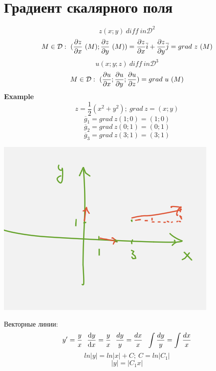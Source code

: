 \documentclass{article}
\begin{document}
\section{Градиент скалярного поля}
\begin{equation*}
    z(x;y)\ diff\ in \mathcal{D}^2
\end{equation*}
\begin{equation*}
    M \in \mathcal{D}:\ (\pdv{z}{x}\ (M); \pdv{z}{y}\ (M)) = \pdv{z}{x}\overline{i}+\pdv{z}{y}\overline{j} = grad\ z\ (M)
\end{equation*}
\begin{equation*}
    u(x;y;z)\ diff\ in \mathcal{D}^3
\end{equation*}
\begin{equation*}
    M \in \mathcal{D}:\ (\pdv{u}{x}; \pdv{u}{y}; \pdv{u}{z}) = grad\ u\ (M)
\end{equation*}
\textbf{Example}
\begin{equation*}
    z= \frac{1}{2}(x^2+y^2);\ grad\ z=(x;y)
\end{equation*}
\begin{equation*}
    \overline{g}_1 = grad\ z(1;0) = (1; 0)
\end{equation*}
\begin{equation*}
    \overline{g}_2 = grad\ z(0;1) = (0; 1)
\end{equation*}
\begin{equation*}
    \overline{g}_3 = grad\ z(3;1) = (3; 1)
\end{equation*}
\begin{center}
    \includegraphics[width=.3\textwidth]{grad.png} 
\end{center}
Векторные линии:
\begin{equation*}
    y' = \frac{y}{x}\ \ \dv{y}{x}= \frac{y}{x}\ \ \frac{dy}{y}= \frac{dx}{x}\ \ \int\frac{dy}{y} = \int\frac{dx}{x}
\end{equation*}
\begin{equation*}
    ln|y| = ln|x| + C;\ C = ln|C_1|
\end{equation*}
\begin{equation*}
    |y|= |C_1x|
\end{equation*}
\end{document}

